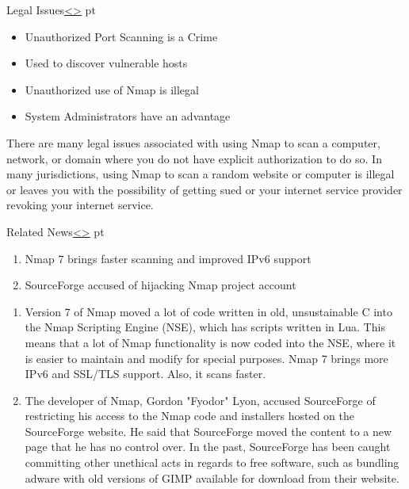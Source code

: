 \documentclass[12pt]{extarticle}
\newenvironment{instructionblock}{\Large\bgroup}{\egroup}
\begin{document}
\pagebreak
\begin{slide}{Legal Issues}{\hyperref[slide 2]{\textless}\hyperref[slide 4]{\textgreater}}
	 pt
	\begin{instructionblock}
		\begin{itemize}
			\item Unauthorized Port Scanning is a Crime
			\item Used to discover vulnerable hosts 
			\item Unauthorized use of Nmap is illegal
			\item System Administrators have an advantage
		\end{itemize}
	\end{instructionblock}
\end{slide}

There are many legal issues associated with using Nmap to scan a computer, network, or domain where you do not have explicit authorization to do so. In many jurisdictions, using Nmap to scan a random website or computer is illegal or leaves you with the possibility of getting sued or your internet service provider revoking your internet service.
\cite{Nmap} 

\pagebreak

\begin{slide}{Related News}{\hyperref[slide 3]{\textless}\hyperref[slide 5]{\textgreater}}
	 pt
	\begin{instructionblock}
		\begin{enumerate}
			\item Nmap 7 brings faster scanning and improved IPv6 support\cite{nmap7}
			\item SourceForge accused of hijacking Nmap project account\cite{sourceforge}
		\end{enumerate}
	\end{instructionblock}
\end{slide}
\begin{enumerate}

\item Version 7 of Nmap moved a lot of code written in old, unsustainable C into the Nmap Scripting Engine (NSE), which has scripts written in Lua. This means that a lot of Nmap functionality is now coded into the NSE, where it is easier to maintain and modify for special purposes. Nmap 7 brings more IPv6 and SSL\slash TLS support. Also, it scans faster.\cite{nmap7}

\item The developer of Nmap, Gordon "Fyodor" Lyon, accused SourceForge of restricting his access to the Nmap code and installers hosted on the SourceForge website. He said that SourceForge moved the content to a new page that he has no control over. In the past, SourceForge has been caught committing other unethical acts in regards to free software, such as bundling adware with old versions of GIMP available for download from their website.\cite{sourceforge}

\end{enumerate}
\end{document}
